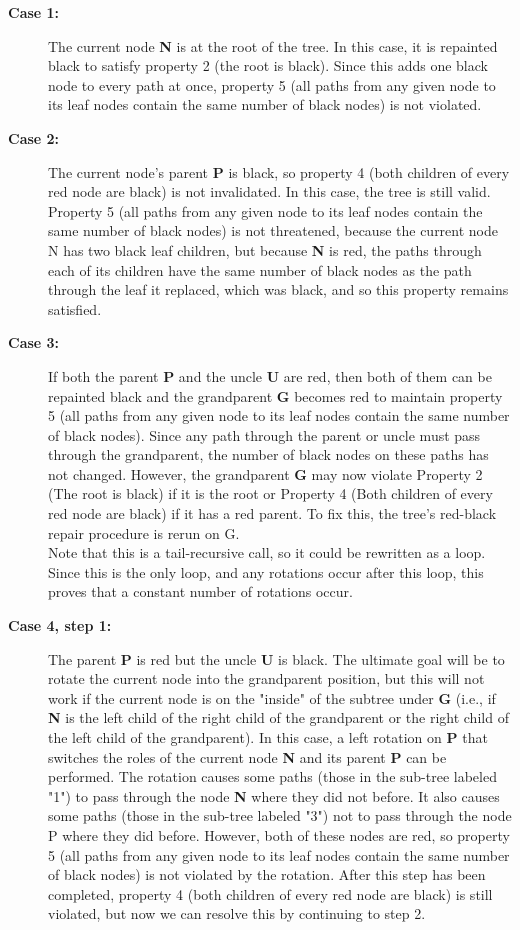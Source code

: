 \documentclass{article}[10pt]
\begin{document}
\begin{description}
    \item[\textbf{Case 1:}]    
                The current node \textbf{N} is at the root of the tree. In this case, it is repainted black to satisfy property 2 (the root is black). Since this adds one black node to every path at once, property 5 (all paths from any given node to its leaf nodes contain the same number of black nodes) is not violated.
    \item[\textbf{Case 2:}]    
                The current node's parent \textbf{P} is black, so property 4 (both children of every red node are black) is not invalidated. In this case, the tree is still valid. Property 5 (all paths from any given node to its leaf nodes contain the same number of black nodes) is not threatened, because the current node N has two black leaf children, but because \textbf{N} is red, the paths through each of its children have the same number of black nodes as the path through the leaf it replaced, which was black, and so this property remains satisfied.   
    \item[\textbf{Case 3:}]    
                If both the parent \textbf{P} and the uncle \textbf{U} are red, then both of them can be repainted black and the grandparent \textbf{G} becomes red to maintain property 5 (all paths from any given node to its leaf nodes contain the same number of black nodes). Since any path through the parent or uncle must pass through the grandparent, the number of black nodes on these paths has not changed. However, the grandparent \textbf{G} may now violate Property 2 (The root is black) if it is the root or Property 4 (Both children of every red node are black) if it has a red parent. To fix this, the tree's red-black repair procedure is rerun on G.\\Note that this is a tail-recursive call, so it could be rewritten as a loop. Since this is the only loop, and any rotations occur after this loop, this proves that a constant number of rotations occur.
    \item[\textbf{Case 4, step 1:}]    
                The parent \textbf{P} is red but the uncle \textbf{U} is black. The ultimate goal will be to rotate the current node into the grandparent position, but this will not work if the current node is on the "inside" of the subtree under \textbf{G} (i.e., if \textbf{N} is the left child of the right child of the grandparent or the right child of the left child of the grandparent). In this case, a left rotation on \textbf{P} that switches the roles of the current node \textbf{N} and its parent \textbf{P} can be performed. The rotation causes some paths (those in the sub-tree labeled "1") to pass through the node \textbf{N} where they did not before. It also causes some paths (those in the sub-tree labeled "3") not to pass through the node P where they did before. However, both of these nodes are red, so property 5 (all paths from any given node to its leaf nodes contain the same number of black nodes) is not violated by the rotation. After this step has been completed, property 4 (both children of every red node are black) is still violated, but now we can resolve this by continuing to step 2.

\end{description}
\end{document}
